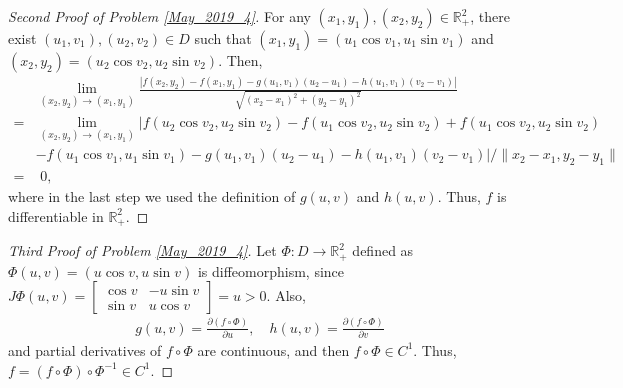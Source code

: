 \documentclass[11pt]{article}
\theoremstyle{definition}
\numberwithin{equation}{subsection}
\begin{document}
\begin{proof}[Second Proof of Problem \ref{May_2019_4}]
For any $(x_1, y_1), (x_2, y_2) \in \mathbb{R}^2_+$, there exist $(u_1, v_1), (u_2, v_2) \in D$ such that $(x_1, y_1) = (u_1 \cos v_1, u_1 \sin v_1)$ and $(x_2, y_2) = (u_2 \cos v_2, u_2 \sin v_2)$. Then,
\begin{align*}
    & \lim_{(x_2,y_2) \to (x_1,y_1)} \frac{\left|f(x_2,y_2) - f(x_1,y_1) - g(u_1,v_1)(u_2 - u_1) - h(u_1,v_1)(v_2 - v_1) \right|}{\sqrt{(x_2-x_1)^2 + (y_2-y_1)^2}} \\
    = & \lim_{(x_2,y_2) \to (x_1,y_1)} | f(u_2 \cos v_2, u_2 \sin v_2) - f(u_1 \cos v_2, u_2 \sin v_2) + f(u_1 \cos v_2, u_2 \sin v_2) \\
    & - f(u_1 \cos v_1, u_1 \sin v_1) - g(u_1,v_1)(u_2 - u_1) - h(u_1,v_1)(v_2 - v_1)| / \|x_2-x_1, y_2-y_1\| \\
    = &\,\,  0,
\end{align*}
where in the last step we used the definition of $g(u,v)$ and $h(u,v)$. Thus, $f$ is differentiable in $\mathbb{R}^2_+$.
\end{proof}

\medskip

\begin{proof}[Third Proof of Problem \ref{May_2019_4}]
Let $\Phi: D \to \mathbb{R}^2_+$ defined as $\Phi(u,v) = (u \cos v, u \sin v)$ is diffeomorphism, since $J\Phi(u,v) = \begin{bmatrix} \cos v & -u \sin v \\ \sin v & u \cos v \end{bmatrix} = u > 0$. Also,
\begin{align*}
    g(u,v) = \frac{\partial (f \circ \Phi)}{\partial u}, \quad h(u,v) = \frac{\partial (f \circ \Phi)}{\partial v}
\end{align*}
and partial derivatives of $f \circ \Phi$ are continuous, and then $f \circ \Phi \in C^1$. Thus, $f = (f \circ \Phi) \circ \Phi^{-1} \in C^1$.
\end{proof}

\medskip
\end{document}
